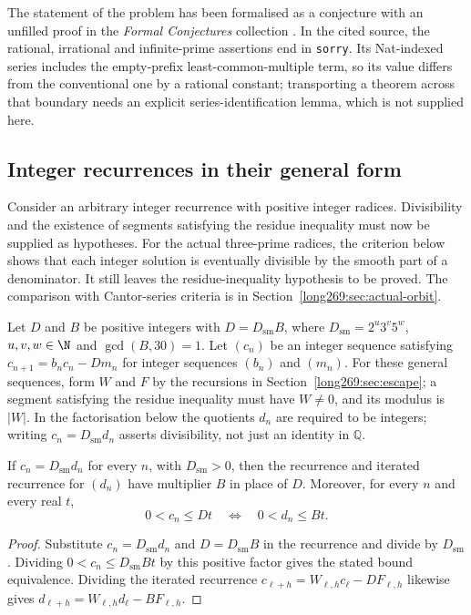The statement of the problem has been formalised as a conjecture with an
unfilled proof in the \emph{Formal Conjectures} collection
\cite{formalconjectures269}.  In the cited source, the rational,
irrational and infinite-prime assertions end in \texttt{sorry}.  Its Nat-indexed series includes the empty-prefix
least-common-multiple term, so its value differs from the conventional one by a
rational constant; transporting a theorem across that boundary needs an
explicit series-identification lemma, which is not supplied here.

\subsection{Integer recurrences in their general form}
\label{long269:long:general-carries}

Consider an arbitrary integer recurrence with positive integer radices.
Divisibility and the existence of segments satisfying the residue inequality must now be supplied
as hypotheses. For the actual three-prime radices, the criterion below
shows that each integer solution is eventually divisible by the smooth part of a
denominator. It still leaves the residue-inequality hypothesis to be proved.
The comparison with Cantor-series criteria is in
Section~\ref{long269:sec:actual-orbit}.

Let $D$ and $B$ be positive integers with $D=D_{\mathrm{sm}}B$, where
$D_{\mathrm{sm}}=2^u3^v5^w$, $u,v,w\in\N$ and $\gcd(B,30)=1$.
Let $(c_n)$ be an integer sequence satisfying $c_{n+1}=b_nc_n-Dm_n$
for integer sequences $(b_n)$ and $(m_n)$.  For these general sequences,
form $W$ and $F$ by the recursions in Section~\ref{long269:sec:escape};
a segment satisfying the residue inequality must have $W\ne0$, and its modulus is $|W|$.
In the factorisation below the quotients $d_n$ are required to be integers;
writing $c_n=D_{\mathrm{sm}}d_n$ asserts divisibility, not just an identity
in $\mathbb Q$.

\begin{proposition}
\label{long269:long:denominator-reduction}
If $c_n=D_{\mathrm{sm}}d_n$ for every $n$, with $D_{\mathrm{sm}}>0$, then the
recurrence and iterated recurrence for $(d_n)$ have multiplier $B$ in place
of $D$.  Moreover, for every $n$ and every real $t$,
\[
 0<c_n\le Dt\quad\Longleftrightarrow\quad0<d_n\le Bt.
\]
\end{proposition}

\begin{proof}
Substitute $c_n=D_{\mathrm{sm}}d_n$ and $D=D_{\mathrm{sm}}B$ in the
recurrence and divide by $D_{\mathrm{sm}}$.  Dividing
$0<c_n\le D_{\mathrm{sm}}Bt$ by this positive factor gives the stated
bound equivalence.  Dividing the iterated recurrence
$c_{\ell+h}=W_{\ell,h}c_\ell-DF_{\ell,h}$ likewise gives
$d_{\ell+h}=W_{\ell,h}d_\ell-BF_{\ell,h}$.
\end{proof}


